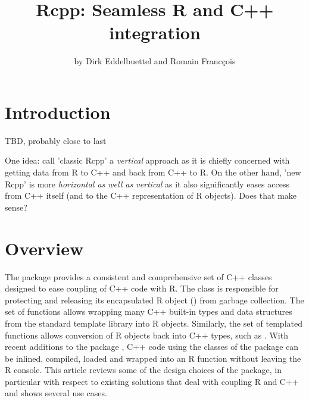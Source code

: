 
\title{Rcpp: Seamless R and C++ integration}
\author{by Dirk Eddelbuettel and Romain Franc\c{c}ois}

\maketitle


\section{Introduction}

TBD, probably close to last

One idea: call 'classic Rcpp' a \textsl{vertical} approach as it is chiefly
concerned with getting data from R to C++ and back from C++ to R. On the
other hand, 'new Rcpp' is more \textsl{horizontal as well as vertical} as it
also significantly eases access from C++ itself (and to the C++
representation of R objects).  Does that make sense?

\section{Overview}


The  package provides a consistent and comprehensive set 
of C++ classes designed to ease coupling of C++ code
with R. The  class is responsible for 
protecting and releasing its encapsulated R object ()
from garbage collection. The  set of functions allows
wrapping many C++ built-in types and data structures from the standard
template library into R objects. Similarly, the  set of 
templated functions allows conversion of R objects back into C++
types, such as . With recent additions to the 
 package \citep{cran:inline}, 
C++ code using the classes of the 
 package can be inlined, compiled, loaded and wrapped 
into an R function without leaving the R console. 
This article reviews some of the design choices of the
 package, in particular with respect to existing solutions
that deal with coupling R and C++ and shows several use cases.

